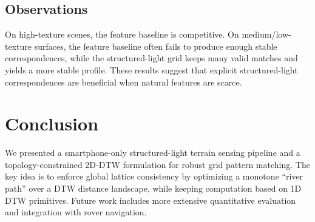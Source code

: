 \documentclass[runningheads]{llncs}
\begin{document}
\subsection{Observations}
On high-texture scenes, the feature baseline is competitive.
On medium/low-texture surfaces, the feature baseline often fails to produce enough stable correspondences,
while the structured-light grid keeps many valid matches and yields a more stable profile.
These results suggest that explicit structured-light correspondences are beneficial when natural features are scarce.

\section{Conclusion}
We presented a smartphone-only structured-light terrain sensing pipeline and a topology-constrained 2D-DTW
formulation for robust grid pattern matching.
The key idea is to enforce global lattice consistency by optimizing a monotone ``river path'' over a DTW distance
landscape, while keeping computation based on 1D DTW primitives.
Future work includes more extensive quantitative evaluation and integration with rover navigation.

\nocite{*}


\end{document}
